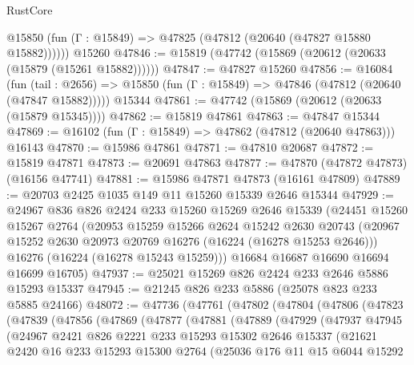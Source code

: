 \begin{lexlean}{RustCore}
\begin{coremodule}
      @15850 (fun (Γ : @15849) => @47825 (@47812 (@20640 (@47827 @15880 @15882))))))
    @15260
@47846 := @15819 (@47742 (@15869 (@20612 (@20633 (@15879 (@15261 @15882))))))
@47847 := @47827 @15260
@47856 := @16084
    (fun (tail : @2656) => @15850 (fun (Γ : @15849) => @47846 (@47812 (@20640 (@47847 @15882)))))
    @15344
@47861 := @47742 (@15869 (@20612 (@20633 (@15879 @15345))))
@47862 := @15819 @47861
@47863 := @47847 @15344
@47869 := @16102 (fun (Γ : @15849) => @47862 (@47812 (@20640 @47863))) @16143
@47870 := @15986 @47861
@47871 := @47810 @20687
@47872 := @15819 @47871
@47873 := @20691 @47863
@47877 := @47870 (@47872 @47873) (@16156 @47741)
@47881 := @15986 @47871 @47873 (@16161 @47809)
@47889 := @20703 @2425 @1035 @149 @11 @15260 @15339 @2646 @15344
@47929 := @24967
    @836
    @826
    @2424
    @233
    @15260
    @15269
    @2646
    @15339
    (@24451
      @15260
      @15267
      @2764
      (@20953
        @15259
        @15266
        @2624
        @15242
        @2630
        @20743
        (@20967 @15252 @2630 @20973 @20769 @16276 (@16224 (@16278 @15253 @2646)))
        @16276
        (@16224 (@16278 @15243 @15259)))
      @16684
      @16687
      @16690
      @16694
      @16699
      @16705)
@47937 := @25021 @15269 @826 @2424 @233 @2646 @5886 @15293 @15337
@47945 := @21245 @826 @233 @5886 (@25078 @823 @233 @5885 @24166)
@48072 := @47736
    (@47761
      (@47802
        (@47804
          (@47806
            (@47823
              (@47839
                (@47856
                  (@47869
                    (@47877
                      (@47881
                        (@47889
                          (@47929
                            (@47937
                              @47945
                              (@24967
                                @2421
                                @826
                                @2221
                                @233
                                @15293
                                @15302
                                @2646
                                @15337
                                (@21621
                                  @2420
                                  @16
                                  @233
                                  @15293
                                  @15300
                                  @2764
                                  (@25036
                                    @176
                                    @11
                                    @15
                                    @6044
                                    @15292

\end{coremodule}
\end{lexlean}
